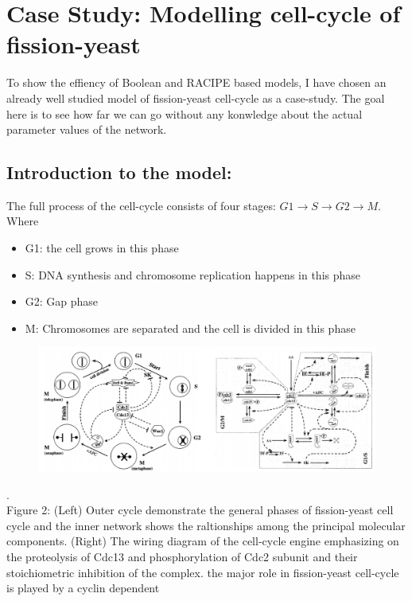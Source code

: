 \documentclass{article}
\begin{document}
\section*{Case Study: Modelling cell-cycle of fission-yeast}
To show the effiency of Boolean and RACIPE based models, I have chosen an 
already well studied model of fission-yeast cell-cycle as a case-study. The 
goal here is to see how far we can go without any konwledge about the actual
parameter values of the network.

\subsection*{Introduction to the model:}
The full process of the cell-cycle consists of four stages: $G1 \rightarrow 
S \rightarrow G2 \rightarrow M$. Where 
\begin{itemize}
  \item G1: the cell grows in this phase 
  \item S: DNA synthesis and chromosome replication happens in this phase
  \item G2: Gap phase 
  \item M: Chromosomes are separated and the cell is divided in this phase
\end{itemize}
\begin{figure}[H]
  \centering
  \includegraphics[width=\linewidth, scale=0.5]{cell_cycle_complicated.png}
\end{figure}
. \\
Figure 2: (Left) Outer cycle demonstrate the general phases of 
fission-yeast cell cycle and the inner network shows the raltionships among the 
principal molecular components. (Right) The wiring diagram of the cell-cycle 
engine emphasizing on the proteolysis of Cdc13 and phosphorylation of Cdc2 
subunit and their stoichiometric inhibition of the complex. \cite{math_model}
\newline \newline
the major role in fission-yeast cell-cycle is played by a cyclin dependent 
\end{document}
